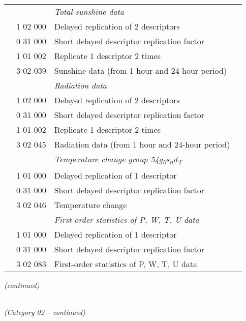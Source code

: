 \begin{longtable}[]{@{}llll@{}}
& & \emph{Total sunshine data} &\tabularnewline
& 1 02 000 & Delayed replication of 2 descriptors &\tabularnewline
& 0 31 000 & Short delayed descriptor replication factor &\tabularnewline
& 1 01 002 & Replicate 1 descriptor 2 times &\tabularnewline
& 3 02 039 & Sunshine data (from 1 hour and 24-hour period) &\tabularnewline
& & \emph{Radiation data} &\tabularnewline
& 1 02 000 & Delayed replication of 2 descriptors &\tabularnewline
& 0 31 000 & Short delayed descriptor replication factor &\tabularnewline
& 1 01 002 & Replicate 1 descriptor 2 times &\tabularnewline
& 3 02 045 & Radiation data (from 1 hour and 24-hour period) &\tabularnewline
& & \emph{Temperature change group 54g\textsubscript{0}s\textsubscript{n}d\textsubscript{T}} &\tabularnewline
& 1 01 000 & Delayed replication of 1 descriptor &\tabularnewline
& 0 31 000 & Short delayed descriptor replication factor &\tabularnewline
& 3 02 046 & Temperature change &\tabularnewline
& & \emph{First-order statistics of P, W, T, U data} &\tabularnewline
& 1 01 000 & Delayed replication of 1 descriptor &\tabularnewline
& 0 31 000 & Short delayed descriptor replication factor &\tabularnewline
& 3 02 083 & First-order statistics of P, W, T, U data &\tabularnewline
\bottomrule
\end{longtable}

\emph{(continued)}

\emph{\\
(Category 02 -- continued)}

